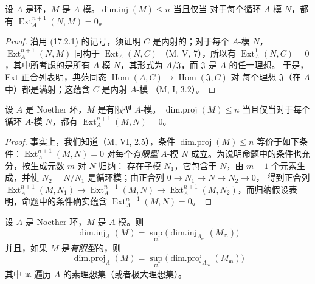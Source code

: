 \begin{lemma}[17.2.3]
\label{0.17.2.3-fr}
设 $A$ 是环，$M$ 是 $A$-模。$\operatorname{dim.inj}(M)\leq n$ 当且仅当
对于每个循环 $A$-模 $N$，都有 $\operatorname{Ext}^{n+1}_A(N,M)=0$。
\end{lemma}

\begin{proof}
沿用 (17.2.1) 的记号，须证明 $C$ 是内射的；对于每个 $A$-模 $N$，
$\operatorname{Ext}^{n+1}_A(N,M)$ 同构于 $\operatorname{Ext}^1_A(N,C)$
（M, V, 7），所以有 $\operatorname{Ext}^1_A(N,C)=0$，其中所考虑的是所有
$A$-模 $N$，其形式为 $A/\mathfrak{J}$，而 $\mathfrak{J}$ 是 $A$ 的任一理想。
于是，Ext 正合列表明，典范同态
$\operatorname{Hom}(A,C)\longrightarrow\operatorname{Hom}(\mathfrak{J},C)$ 对
每个理想 $\mathfrak{J}$（在 $A$ 中）都是满射；这蕴含 $C$ 是内射 $A$-模
（M, I, 3.2）。
\end{proof}

\begin{lemma}[17.2.4]
\label{0.17.2.4-fr}
设 $A$ 是 Noether 环，$M$ 是有限型 $A$-模。
$\operatorname{dim.proj}(M)\leq n$ 当且仅当对于每个循环 $A$-模 $N$，都有
$\operatorname{Ext}^{n+1}_A(M,N)=0$。
\end{lemma}

\begin{proof}
事实上，我们知道（M, VI, 2.5），条件 $\operatorname{dim.proj}(M)\leq n$
等价于如下条件：$\operatorname{Ext}^{n+1}_A(M,N)=0$ 对每个\emph{有限型}
$A$-模 $N$ 成立。为说明命题中的条件也充分，按生成元数 $m$ 对 $N$ 归纳：
存在子模 $N_1$，它包含于 $N$，由 $m-1$ 个元素生成，并使
$N_2=N/N_1$ 是循环模；由正合列
$0\longrightarrow N_1\longrightarrow N\longrightarrow N_2\longrightarrow0$，
得到正合列
$\operatorname{Ext}^{n+1}_A(M,N_1)\longrightarrow
\operatorname{Ext}^{n+1}_A(M,N)\longrightarrow
\operatorname{Ext}^{n+1}_A(M,N_2)$，而归纳假设表明，命题中的条件确实蕴含
$\operatorname{Ext}^{n+1}_A(M,N)=0$。
\end{proof}

\begin{corollary}[17.2.5]
\label{0.17.2.5-fr}
设 $A$ 是 Noether 环，$M$ 是 $A$-模。则
\begin{equation}
\label{0.17.2.5.1-fr}
\tag{17.2.5.1}
  \operatorname{dim.inj}_A(M)
  =\sup_{\mathfrak{m}}
  \bigl(\operatorname{dim.inj}_{A_{\mathfrak{m}}}(M_{\mathfrak{m}})\bigr)
\end{equation}
并且，如果 $M$ 是\emph{有限型}的，则
\begin{equation}
\label{0.17.2.5.2-fr}
\tag{17.2.5.2}
  \operatorname{dim.proj}_A(M)
  =\sup_{\mathfrak{m}}
  \bigl(\operatorname{dim.proj}_{A_{\mathfrak{m}}}(M_{\mathfrak{m}})\bigr)
\end{equation}
其中 $\mathfrak{m}$ 遍历 $A$ 的素理想集（或者极大理想集）。
\end{corollary}

